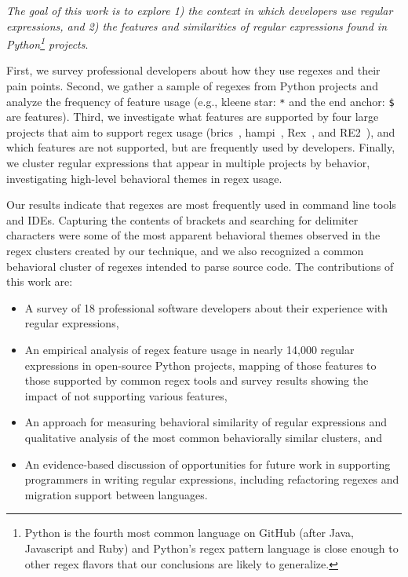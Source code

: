 \emph{The goal of this work is to explore 1) the context in which developers use regular expressions, and 2) the features and similarities of  regular expressions found in Python\footnote{Python is the fourth most common language on GitHub (after Java, Javascript and Ruby) and  Python's regex pattern language is close enough to other regex flavors that our conclusions are likely to generalize.} projects}. 

First, we survey professional developers about how they use regexes and their pain points.  Second, we gather a sample of regexes from Python projects and analyze the frequency of feature usage (e.g., kleene star: \verb!*! and the end anchor: \verb!$! are features).    Third, we investigate what features are supported by four large projects that aim to support regex usage (brics~\cite{brics}, hampi~\cite{hampi}, Rex~\cite{rex}, and RE2~\cite{re2}), and which features are not supported, but are frequently used by developers.  Finally, we cluster regular expressions that appear in multiple projects by behavior, investigating high-level behavioral themes in regex usage. 

Our results indicate that regexes are most frequently used in command line tools and IDEs.    Capturing the contents of brackets and searching for delimiter characters were some of the most apparent  behavioral themes observed in the regex clusters created by our technique, and we also recognized a common behavioral cluster of regexes intended to parse source code. 
The contributions of this work are:
\begin{itemize}
    \item A survey of 18 professional software developers about their experience with regular expressions,
	\item An empirical analysis of regex feature usage in nearly 14,000 regular expressions in  open-source Python projects, mapping of those features to those supported by common regex tools and survey results showing the impact of not supporting various features,
	\item An approach for measuring behavioral similarity of regular expressions and qualitative analysis of the most common behaviorally similar clusters, and
	\item An evidence-based discussion of opportunities for future work in supporting programmers in writing regular expressions, including refactoring regexes and migration support between languages.
\end{itemize}

